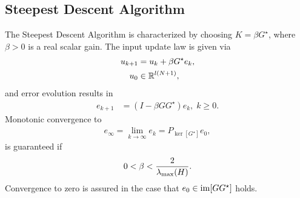 \subsection{Steepest Descent Algorithm}
\begin{alg}
	\label{alg:SDA}
	The Steepest Descent Algorithm is characterized by choosing $K = \beta G^\star$, where $\beta>0$ is a real scalar gain. The input update law is given via 
	\begin{align}
	\label{eq:errSDA}
	\begin{split}
	u_{k+1} &= u_k + \beta G^\star e_k,\\
	u_0 &\in {\mathbb{R}}^{l (N+1)}, 
	\end{split}
	\end{align}
	and error evolution results in 
	\begin{align}
	e_{k+1} &= (I- \beta G G^\star) e_{k}, \; k\geq 0.
	\end{align}
	Monotonic convergence to 
	\begin{align}
	\label{eq:SDAErrLim} 
	e_\infty  = \lim_{k\to\infty} e_k = P_{\ker[G^\star]}e_0,
	\end{align} 
	is guaranteed if
	\begin{align*}
	0 <\beta < \frac{2}{\lambda_{\mathrm{max}}(H)}.
	\end{align*}
	Convergence to zero is assured in the case that $e_0 \in \operatorname{im} [G G^\star]$ holds.
\end{alg} 

